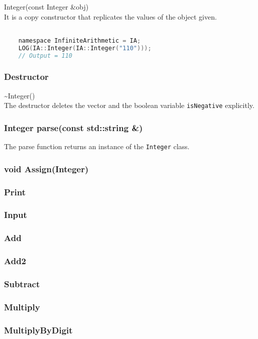 \noindent
{\ttfamily \large Integer(const Integer \&obj)} \\[2mm]
It is a copy constructor that replicates the values of the object given.
\vspace*{1em}
\begin{lstlisting}[language = C]

	namespace InfiniteArithmetic = IA;
	LOG(IA::Integer(IA::Integer("110")));
	// Output = 110
\end{lstlisting}
\vspace*{1em}


\subsubsection{Destructor}
{\ttfamily \large \~{}Integer()} \\[2mm]
The destructor deletes the vector and the boolean variable \verb|isNegative| explicitly.

\subsubsection{Integer parse(const std::string \&)}
The parse function returns an instance of the \verb|Integer| class.
\subsubsection{void Assign(Integer)}
\subsubsection{Print}
\subsubsection{Input}
\subsubsection{Add}
\subsubsection{Add2}
\subsubsection{Subtract}
\subsubsection{Multiply}
\subsubsection{MultiplyByDigit}
